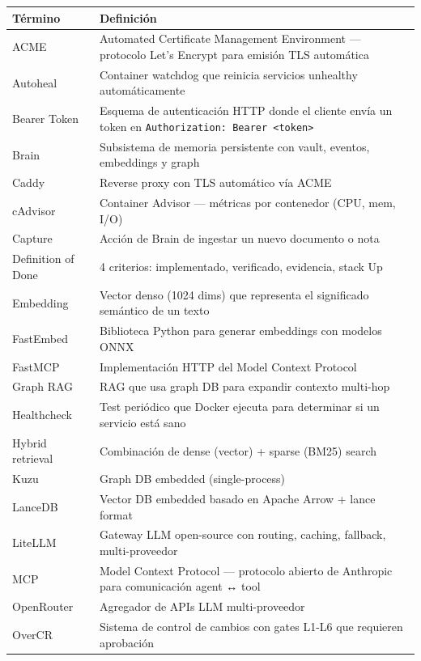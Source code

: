 \documentclass[11pt,a4paper]{article}
\begin{document}
\begin{center}
\begin{longtable}{|l|p{9.5cm}|}
\hline
\rowcolor{hermesblue}\color{white}\textbf{Término} & \color{white}\textbf{Definición}\\
\hline
\endhead
ACME & Automated Certificate Management Environment — protocolo Let's Encrypt para emisión TLS automática\\
Autoheal & Container watchdog que reinicia servicios unhealthy automáticamente\\
Bearer Token & Esquema de autenticación HTTP donde el cliente envía un token en \texttt{Authorization: Bearer <token>}\\
Brain & Subsistema de memoria persistente con vault, eventos, embeddings y graph\\
Caddy & Reverse proxy con TLS automático vía ACME\\
cAdvisor & Container Advisor — métricas por contenedor (CPU, mem, I/O)\\
Capture & Acción de Brain de ingestar un nuevo documento o nota\\
Definition of Done & 4 criterios: implementado, verificado, evidencia, stack Up\\
Embedding & Vector denso (1024 dims) que representa el significado semántico de un texto\\
FastEmbed & Biblioteca Python para generar embeddings con modelos ONNX\\
FastMCP & Implementación HTTP del Model Context Protocol\\
Graph RAG & RAG que usa graph DB para expandir contexto multi-hop\\
Healthcheck & Test periódico que Docker ejecuta para determinar si un servicio está sano\\
Hybrid retrieval & Combinación de dense (vector) + sparse (BM25) search\\
Kuzu & Graph DB embedded (single-process)\\
LanceDB & Vector DB embedded basado en Apache Arrow + lance format\\
LiteLLM & Gateway LLM open-source con routing, caching, fallback, multi-proveedor\\
MCP & Model Context Protocol — protocolo abierto de Anthropic para comunicación agent ↔ tool\\
OpenRouter & Agregador de APIs LLM multi-proveedor\\
OverCR & Sistema de control de cambios con gates L1-L6 que requieren aprobación\\

\end{longtable}
\end{center}
\end{document}
